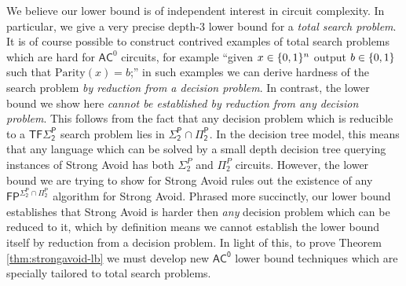 We believe our lower bound is of independent interest in %
circuit complexity. In particular, we give a very precise depth-3 lower bound for a \emph{total search problem}. It is of course possible to construct contrived examples of total search problems which are hard for $\mathsf{AC}^0$ circuits, for example ``given $x \in \{0,1\}^n$ output $b \in \{0,1\}$ such that $\mathrm{Parity}(x)=b$;'' in such examples we can derive hardness of the search problem \emph{by reduction from a decision problem}. In contrast, the lower bound we show here \emph{cannot be established by reduction from any decision problem}. This follows from the fact that any decision problem which is reducible to a $\mathsf{TF\Sigma_2^P}$ search problem lies in $\mathsf{\Sigma_2^P \cap \Pi_2^P}$. In the decision tree model, this means that any language which can be solved by a small depth decision tree querying instances of Strong Avoid has both $\Sigma_2^P$ and $\Pi_2^P$ circuits. However, the lower bound we are trying to show for Strong Avoid rules out the existence of any $\mathsf{FP^{\Sigma_2^P \cap \Pi_2^P}}$ algorithm for Strong Avoid. Phrased more succinctly, our lower bound establishes that Strong Avoid is harder then \emph{any} decision problem which can be reduced to it, which by definition means we cannot establish the lower bound itself by reduction from a decision problem. In light of this, to prove Theorem \ref{thm:strongavoid-lb} we must develop new $\mathsf{AC^0}$ lower bound techniques which are specially tailored to total search problems.


